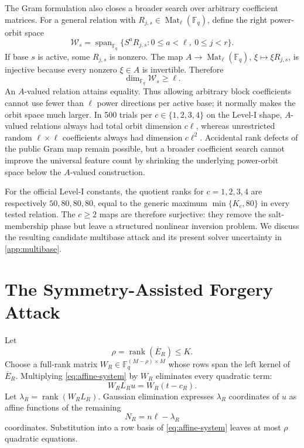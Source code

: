 \documentclass[runningheads]{llncs}
\newcommand{\F}{\mathbb F}
\newcommand{\Mat}{\operatorname{Mat}}
\newcommand{\rank}{\operatorname{rank}}
\newcommand{\Span}{\operatorname{span}}
\begin{document}
The Gram formulation also closes a broader search over arbitrary coefficient
matrices.  For a general relation with $R_{j,s}\in\Mat_\ell(\F_q)$, define
the right power-orbit space
\[
 \mathcal W_s=\Span_{\F_q}\{S^aR_{j,s}:0\le a<\ell,\ 0\le j<r\}.
\]
If base $s$ is active, some $R_{j,s}$ is nonzero.  The map
$A\to\Mat_\ell(\F_q)$, $\xi\mapsto\xi R_{j,s}$, is injective because every
nonzero $\xi\in A$ is invertible.  Therefore
\begin{equation}\label{eq:orbit-lower}
 \dim_{\F_q}\mathcal W_s\ge\ell.
\end{equation}
An $A$-valued relation attains equality.  Thus allowing arbitrary block
coefficients cannot use fewer than $\ell$ power directions per active base;
it normally makes the orbit space much larger.  In 500 trials per
$c\in\{1,2,3,4\}$ on the Level-I shape, $A$-valued relations always had
total orbit dimension $c\ell$, whereas unrestricted random
$\ell\times\ell$ coefficients always had dimension $c\ell^2$.  Accidental
rank defects of the public Gram map remain possible, but a broader coefficient
search cannot improve the universal feature count by shrinking the underlying
power-orbit space below the $A$-valued construction.

For the official Level-I constants, the quotient ranks for $c=1,2,3,4$ are
respectively $50,80,80,80$, equal to the generic maximum
$\min\{K_c,80\}$ in every tested relation.  The $c\ge2$ maps are therefore
surjective: they remove the salt-membership phase but leave a structured
nonlinear inversion problem.  We discuss the resulting candidate multibase
attack and its present solver uncertainty in \cref{app:multibase}.

\section{The Symmetry-Assisted Forgery Attack}\label{sec:attack}

Let
\[
 \rho=\rank(\overline E_R)\le K.
\]
Choose a full-rank matrix $W_R\in\F_q^{(M-\rho)\times M}$ whose rows span the left kernel of $\overline E_R$.  Multiplying \cref{eq:affine-system} by $W_R$ eliminates every quadratic term:
\begin{equation}\label{eq:linear}
 W_RL_Ru=W_R(t-c_R).
\end{equation}
Let $\lambda_R=\rank(W_RL_R)$.  Gaussian elimination expresses $\lambda_R$ coordinates of $u$ as affine functions of the remaining
\[
 N_R=n\ell-\lambda_R
\]
coordinates.  Substitution into a row basis of \cref{eq:affine-system} leaves at most $\rho$ quadratic equations.
\end{document}
